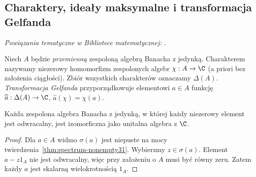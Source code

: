 \subsection{Charaktery, ideały maksymalne i transformacja Gelfanda}

\noindent\emph{Powiązania tematyczne w Bibliotece matematycznej:} .


\begin{definicja}
\label{def:character31}
Niech $A$ będzie \emph{przemienną} zespoloną algebrą Banacha
z jedynką. Charakterem nazywamy niezerowy homomorfizm
zespolonych algebr $\chi:A\to\C$ (a priori bez założenia ciągłości).
Zbiór wszystkich charakterów oznaczamy $\Delta(A)$.
\emph{Transformacja Gelfanda} przyporządkowuje elementowi $a\in A$
funkcję $\widehat a:\Delta(A)\to\C$, $\widehat a(\chi)=\chi(a)$.
\end{definicja}

\begin{lemat}
\label{lem:gelfand-mazur31}
Każda zespolona algebra Banacha z jedynką, w której każdy niezerowy
element jest odwracalny, jest izomorficzna jako unitalna algebra z $\C$.
\end{lemat}
\begin{proof}
Dla $a\in A$ widmo $\sigma(a)$ jest niepuste na mocy
twierdzenia~\ref{thm:spectrum-nonempty31}. Wybierzmy
$z\in\sigma(a)$. Element $a-z1_A$ nie jest odwracalny,
więc przy założeniu o $A$ musi być równy zeru.
Zatem każdy $a$ jest skalarną wielokrotnością $1_A$.
\end{proof}

